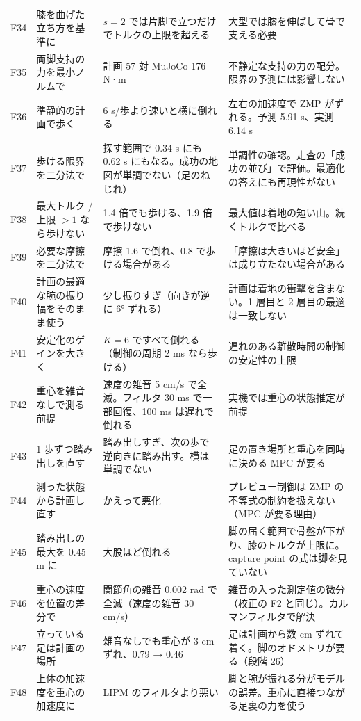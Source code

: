 \documentclass[paper=a4paper,fontsize=10pt,twocolumn,column_gap=2zw,line_length=24zw,number_of_lines=46,head_space=20mm]{jlreq}
\begin{document}
\begin{table}[t]
\begin{tabular}{cp{}p{}p{}}
F34 & 膝を曲げた立ち方を基準に & $s=2$ では片脚で立つだけでトルクの上限を超える & 大型では膝を伸ばして骨で支える必要 \\
F35 & 両脚支持の力を最小ノルムで & 計画 57 対 MuJoCo 176 N·m & 不静定な支持の力の配分。限界の予測には影響しない \\
F36 & 準静的の計画で歩く & 6 s/歩より速いと横に倒れる & 左右の加速度で ZMP がずれる。予測 5.91 s、実測 6.14 s \\
F37 & 歩ける限界を二分法で & 探す範囲で 0.34 s にも 0.62 s にもなる。成功の地図が単調でない（足のねじれ） & 単調性の確認。走査の「成功の並び」で評価。最適化の答えにも再現性がない \\
F38 & 最大トルク / 上限 $>1$ なら歩けない & 1.4 倍でも歩ける、1.9 倍で歩けない & 最大値は着地の短い山。続くトルクで比べる \\
F39 & 必要な摩擦を二分法で & 摩擦 1.6 で倒れ、0.8 で歩ける場合がある & 「摩擦は大きいほど安全」は成り立たない場合がある \\
F40 & 計画の最適な腕の振り幅をそのまま使う & 少し振りすぎ（向きが逆に 6° ずれる） & 計画は着地の衝撃を含まない。1 層目と 2 層目の最適は一致しない \\
F41 & 安定化のゲインを大きく & $K=6$ ですべて倒れる（制御の周期 2 ms なら歩ける） & 遅れのある離散時間の制御の安定性の上限 \\
F42 & 重心を雑音なしで測る前提 & 速度の雑音 5 cm/s で全滅。フィルタ 30 ms で一部回復、100 ms は遅れで倒れる & 実機では重心の状態推定が前提 \\
F43 & 1 歩ずつ踏み出しを直す & 踏み出しすぎ、次の歩で逆向きに踏み出す。横は単調でない & 足の置き場所と重心を同時に決める MPC が要る \\
F44 & 測った状態から計画し直す & かえって悪化 & プレビュー制御は ZMP の不等式の制約を扱えない（MPC が要る理由） \\
F45 & 踏み出しの最大を 0.45 m に & 大股ほど倒れる & 脚の届く範囲で骨盤が下がり、膝のトルクが上限に。capture point の式は脚を見ていない \\
F46 & 重心の速度を位置の差分で & 関節角の雑音 0.002 rad で全滅（速度の雑音 30 cm/s） & 雑音の入った測定値の微分（校正の F2 と同じ）。カルマンフィルタで解決 \\
F47 & 立っている足は計画の場所 & 雑音なしでも重心が 3 cm ずれ、0.79 → 0.46 & 足は計画から数 cm ずれて着く。脚のオドメトリが要る（段階 26） \\
F48 & 上体の加速度を重心の加速度に & LIPM のフィルタより悪い & 脚と腕が振れる分がモデルの誤差。重心に直接つながる足裏の力を使う \\

\end{tabular}
\end{table}
\end{document}
